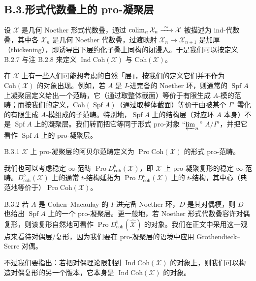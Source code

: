 \subsection*{B.3.\quad 形式代数叠上的 pro-凝聚层}
设 $\mathcal X$ 是几何 Noether 形式代数叠，通过 $\operatorname*{colim}_n\mathcal X_n\xrightarrow{\ \sim\ }\mathcal X$ 被描述为 ind-代数叠，其中各 $\mathcal X_n$ 是几何 Noether 代数叠，过渡映射 $\mathcal X_n\to\mathcal X_{n+1}$ 是加厚（thickening），即诱导出下层约化子叠上同构的闭浸入。于是我们可以按定义 B.2.7 与注 B.2.8 来定义 $\operatorname{Ind}\mathrm{Coh}(\mathcal X)$ 与 $\mathrm{Coh}(\mathcal X)$。

在 $\mathcal X$ 上有一些人们可能想考虑的自然「层」，按我们的定义它们并不作为 $\mathrm{Coh}(\mathcal X)$ 的对象出现。例如，若 $A$ 是 $I$-进完备的 Noether 环，则通常的 $\operatorname{Spf}A$ 上凝聚层定义给出一个范畴，它（通过取整体截面）等价于有限生成 $A$-模的范畴；而按我们的定义，$\mathrm{Coh}(\operatorname{Spf}A)$（通过取整体截面）等价于由被某个 $I^n$ 零化的有限生成 $A$-模组成的子范畴。特别地，$\operatorname{Spf}A$ 上的结构层（对应环 $A$ 本身）不是 $\operatorname{Spf}A$ 上的凝聚层。我们转而把它等同于形式 pro-对象 “$\varprojlim_n$” $A/I^n$，并把它看作 $\operatorname{Spf}A$ 上的 pro-凝聚层。

\begin{defn}{B.3.1}\label{thm:a4-18-28}
$\mathcal X$ 上 pro-凝聚层的阿贝尔范畴定义为 $\operatorname{Pro}\mathrm{Coh}(\mathcal X)$ 的形式 pro-范畴。
\end{defn}

我们也可以考虑稳定 $\infty$-范畴 $\operatorname{Pro}D^b_{\mathrm{coh}}(\mathcal X)$，即 $\mathcal X$ 上 pro-凝聚复形的稳定 $\infty$-范畴。$D^b_{\mathrm{coh}}(\mathcal X)$ 上的通常 $t$-结构延拓为 $\operatorname{Pro}D^b_{\mathrm{coh}}(\mathcal X)$ 上的 $t$-结构，其中心（典范地等价于）$\operatorname{Pro}\mathrm{Coh}(\mathcal X)$。

\begin{exam}{B.3.2}\label{thm:a4-18-29}
若 $A$ 是 Cohen--Macaulay 的 $I$-进完备 Noether 环，$D$ 是其对偶模，则 $D$ 也给出 $\operatorname{Spf}A$ 上的一个 pro-凝聚层。更一般地，若 Noether 形式代数叠容许对偶复形，则该复形自然地可看作 $\operatorname{Pro}D^b_{\mathrm{coh}}(\widehat{\mathcal X})$ 的对象。我们在正文中采用这一观点来看待对偶层/复形，因为我们要在 pro-凝聚层的语境中应用 Grothendieck--Serre 对偶。
\end{exam}

不过我们要指出：若把对偶理论限制到 $\operatorname{Ind}\mathrm{Coh}(\mathcal X)$ 的对象上，则我们可以构造对偶复形的另一个版本，它本身是 $\operatorname{Ind}\mathrm{Coh}(\mathcal X)$ 的对象。

